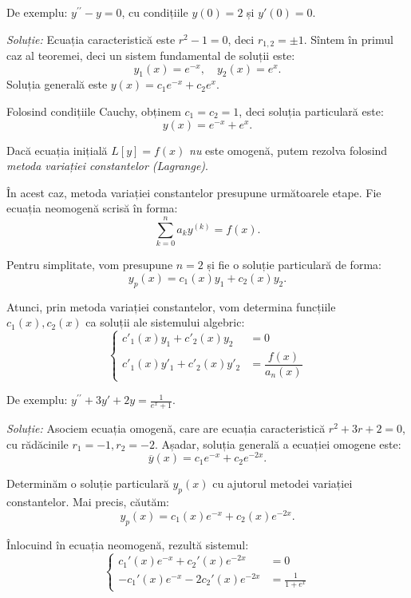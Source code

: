 De exemplu: $y^{\prime\prime} - y = 0$, cu condițiile $y(0) = 2$ și $y'(0) = 0$.

\emph{Soluție:} Ecuația caracteristică este $r^2 - 1 = 0$, deci $r_{1,2} = \pm 1$.
Sîntem în primul caz al teoremei, deci un sistem fundamental de soluții este:
\[
  y_1(x) = e^{-x}, \quad y_2(x) = e^x.
\]
Soluția generală este $y(x) = c_1 e^{-x} + c_2 e^x$.

Folosind condițiile Cauchy, obținem $c_1 = c_2 = 1$, deci soluția particulară este:
\[
  y(x) = e^{-x} + e^x.
\]

\vspace{1cm}

\begin{remark}\label{rk:neomogen}
  Dacă ecuația inițială $L[y] = f(x)$ \emph{nu} este omogenă, putem rezolva folosind
  \emph{metoda variației constantelor (Lagrange)}.
\end{remark}

În acest caz, metoda variației constantelor presupune următoarele etape.
Fie ecuația neomogenă scrisă în forma:
\[
  \sum_{k = 0}^n a_k y^{(k)} = f(x).
\]

Pentru simplitate, vom presupune $n = 2$ și fie o soluție particulară de forma:
\[
  y_p(x) = c_1(x) y_1 + c_2(x) y_2.
\]

Atunci, prin metoda variației constantelor, vom determina funcțiile $c_1(x), c_2(x)$
ca soluții ale sistemului algebric:
\[
  \begin{cases}
    c'_1(x) y_1 + c'_2(x) y_2 &= 0 \\
    c'_1(x) y'_1 + c'_2(x) y'_2 &= \dfrac{f(x)}{a_n(x)}
  \end{cases}
\]

\vspace{1cm}

De exemplu: $y^{\prime \prime} + 3y' + 2y = \frac{1}{e^x + 1}$.

\emph{Soluție:} Asociem ecuația omogenă, care are ecuația caracteristică
$r^2 + 3r + 2 = 0$, cu rădăcinile $r_1 = -1, r_2 = -2$. Așadar, soluția generală
a ecuației omogene este:
\[
  \overline{y}(x) = c_1 e^{-x} + c_2 e^{-2x}.
\]

Determinăm o soluție particulară $y_p(x)$ cu ajutorul metodei variației constantelor.
Mai precis, căutăm:
\[
  y_p(x) = c_1(x) e^{-x} + c_2(x) e^{-2x}.
\]

Înlocuind în ecuația neomogenă, rezultă sistemul:
\[
  \begin{cases}
    c_1'(x) e^{-x} + c_2'(x) e^{-2x} &= 0 \\
    -c_1'(x) e^{-x} - 2c_2'(x) e^{-2x} &= \frac{1}{1 + e^x}
  \end{cases}
\]

